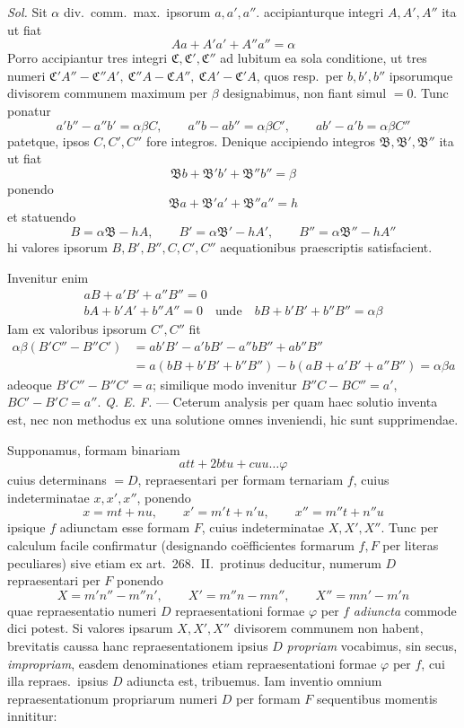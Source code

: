 \textit{Sol.} Sit $\alpha$ div.\ comm.\ max.\ ipsorum $a,a',a''$. accipianturque
integri $A,A',A''$ ita ut fiat
\[
Aa+A'a'+A''a''=\alpha
\]
Porro accipiantur tres integri $\mathfrak{C},\allowbreak \mathfrak{C}',\allowbreak \mathfrak{C}''$ ad
lubitum ea sola conditione, ut tres numeri
$\mathfrak{C}'A''-\mathfrak{C}''A',\allowbreak \ \mathfrak{C}''A-\mathfrak{C}A'',\allowbreak \
\mathfrak{C}A'-\mathfrak{C}'A$, quos resp.\ per $b,b',b''$ ipsorumque divisorem
communem maximum per $\beta$ designabimus, non fiant simul $=0$. Tunc ponatur
\[
a'b''-a''b'=\alpha\beta C,\qquad
a''b-ab''=\alpha\beta C',\qquad
ab'-a'b=\alpha\beta C''
\]
patetque, ipsos $C,C',C''$ fore integros. Denique accipiendo integros
$\mathfrak{B},\allowbreak \mathfrak{B}',\allowbreak \mathfrak{B}''$ ita ut fiat
\[
\mathfrak{B}b+\mathfrak{B}'b'+\mathfrak{B}''b''=\beta
\]
ponendo
\[
\mathfrak{B}a+\mathfrak{B}'a'+\mathfrak{B}''a''=h
\]
et statuendo
\[
B=\alpha\mathfrak{B}-hA,\qquad
B'=\alpha\mathfrak{B}'-hA',\qquad
B''=\alpha\mathfrak{B}''-hA''
\]
hi valores ipsorum $B,B',B'',C,C',C''$ aequationibus praescriptis satisfacient.

Invenitur enim
\[
\begin{gathered}
aB+a'B'+a''B''=0\\
bA+b'A'+b''A''=0\quad\text{unde}\quad bB+b'B'+b''B''=\alpha\beta
\end{gathered}
\]
Iam ex valoribus ipsorum $C',C''$ fit
\[
\begin{aligned}
\alpha\beta(B'C''-B''C')
&=ab'B'-a'bB'-a''bB''+ab''B''\\
&=a(bB+b'B'+b''B'')-b(aB+a'B'+a''B'')=\alpha\beta a
\end{aligned}
\]
adeoque $B'C''-B''C'=a$; similique modo invenitur $B''C-BC''=a'$, $BC'-B'C=a''$.
\textit{Q. E. F.} --- Ceterum analysis per quam haec solutio inventa est,
nec non methodus ex una solutione omnes inveniendi, hic sunt supprimendae.

Supponamus, formam binariam
\[
att+2btu+cuu\ldots\varphi
\]
cuius determinans $=D$, repraesentari per formam ternariam $f$, cuius
indeterminatae $x,x',x''$, ponendo
\[
x=mt+nu,\qquad x'=m't+n'u,\qquad x''=m''t+n''u
\]
ipsique $f$ adiunctam esse formam $F$, cuius indeterminatae $X,X',X''$. Tunc
per calculum facile confirmatur (designando coëfficientes formarum $f,F$ per
literas peculiares) sive etiam ex art.\ 268.\ II.\ protinus deducitur, numerum
$D$ repraesentari per $F$ ponendo
\[
X=m'n''-m''n',\qquad X'=m''n-mn'',\qquad X''=mn'-m'n
\]
quae repraesentatio numeri $D$ repraesentationi formae $\varphi$ per $f$
\textit{adiuncta} commode dici potest. Si valores ipsarum $X,X',X''$ divisorem
communem non habent, brevitatis caussa hanc repraesentationem ipsius $D$
\textit{propriam} vocabimus, sin secus, \textit{impropriam}, easdem denominationes
etiam repraesentationi formae $\varphi$ per $f$, cui illa repraes.\ ipsius $D$
adiuncta est, tribuemus. Iam inventio omnium repraesentationum propriarum numeri
$D$ per formam $F$ sequentibus momentis innititur:

